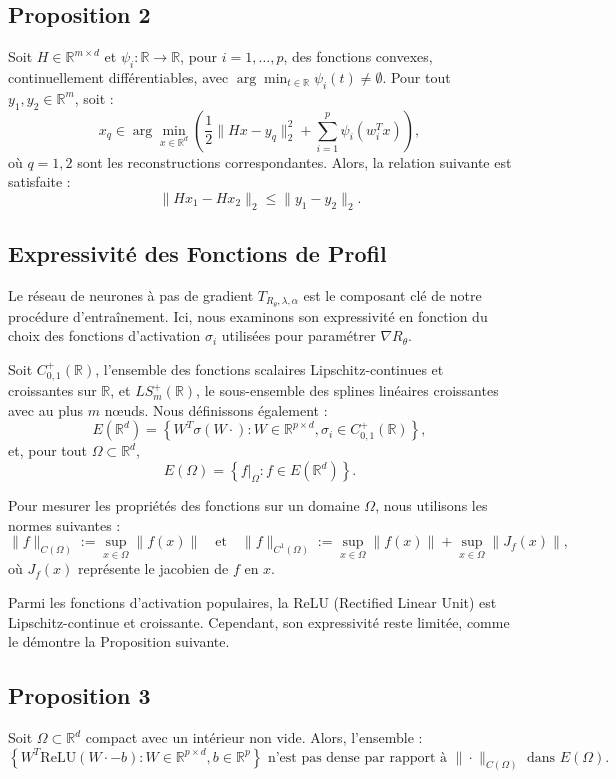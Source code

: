 \documentclass[a4paper, 12pt]{report} %
\begin{document}
\subsection*{Proposition 2}

Soit \( H \in \mathbb{R}^{m \times d} \) et \( \psi_i : \mathbb{R} \to \mathbb{R} \), pour \( i = 1, \ldots, p \), des fonctions convexes, continuellement différentiables, avec \( \arg \min_{t \in \mathbb{R}} \psi_i(t) \neq \emptyset \). Pour tout \( y_1, y_2 \in \mathbb{R}^m \), soit :  
\[
x_q \in \arg \min_{x \in \mathbb{R}^d} \left( \frac{1}{2} \| Hx - y_q \|_2^2 + \sum_{i=1}^p \psi_i(w_i^T x) \right),
\]
où \( q = 1, 2 \) sont les reconstructions correspondantes. Alors, la relation suivante est satisfaite :  
\[
\| Hx_1 - Hx_2 \|_2 \leq \| y_1 - y_2 \|_2.
\]

\subsection{Expressivité des Fonctions de Profil}
Le réseau de neurones à pas de gradient \( T_{R_\theta,\lambda,\alpha} \) est le composant clé de notre procédure d'entraînement. Ici, nous examinons son expressivité en fonction du choix des fonctions d'activation \( \sigma_i \) utilisées pour paramétrer \( \nabla R_\theta \).

Soit \( C_{0,1}^+(\mathbb{R}) \), l'ensemble des fonctions scalaires Lipschitz-continues et croissantes sur \( \mathbb{R} \), et \( LS_m^+(\mathbb{R}) \), le sous-ensemble des splines linéaires croissantes avec au plus \( m \) nœuds. Nous définissons également :  
\[
E(\mathbb{R}^d) = \left\{ W^T \sigma(W \cdot) : W \in \mathbb{R}^{p \times d}, \sigma_i \in C_{0,1}^+(\mathbb{R}) \right\},
\]
et, pour tout \( \Omega \subset \mathbb{R}^d \),
\[
E(\Omega) = \left\{ f|_{\Omega} : f \in E(\mathbb{R}^d) \right\}.
\]

Pour mesurer les propriétés des fonctions sur un domaine \( \Omega \), nous utilisons les normes suivantes :
\[
\|f\|_{C(\Omega)} := \sup_{x \in \Omega} \|f(x)\| \quad \text{et} \quad \|f\|_{{C^1}(\Omega)} := \sup_{x \in \Omega} \|f(x)\| + \sup_{x \in \Omega} \|J_f(x)\|,
\]
où \( J_f(x) \) représente le jacobien de \( f \) en \( x \).

Parmi les fonctions d'activation populaires, la ReLU (Rectified Linear Unit) est Lipschitz-continue et croissante. Cependant, son expressivité reste limitée, comme le démontre la Proposition suivante.

\subsection*{Proposition 3}
Soit \( \Omega \subset \mathbb{R}^d \) compact avec un intérieur non vide. Alors, l'ensemble :
\[
\left\{ W^T \text{ReLU}(W \cdot - b) : W \in \mathbb{R}^{p \times d}, b \in \mathbb{R}^p \right\}
\text{ n'est pas dense par rapport à } \| \cdot \|_{C(\Omega)} \text{ dans } E(\Omega).\]
\end{document}
